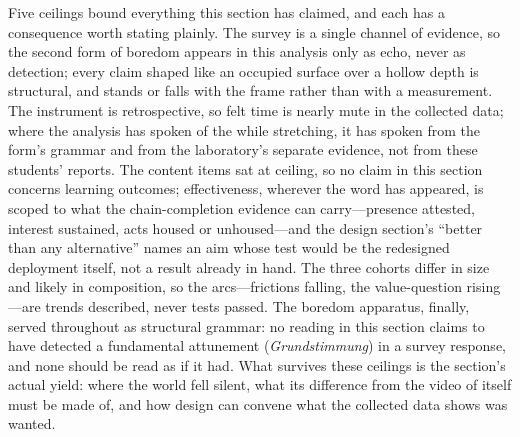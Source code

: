 
Five ceilings bound everything this section has claimed, and each has
a consequence worth stating plainly. The survey is a single channel of
evidence, so the second form of boredom appears in this analysis only
as echo, never as detection; every claim shaped like an occupied
surface over a hollow depth is structural, and stands or falls with
the frame rather than with a measurement. The instrument is
retrospective, so felt time is nearly mute in the collected data;
where the analysis has spoken of the while stretching, it has spoken
from the form's grammar and from the laboratory's separate evidence,
not from these students' reports. The content items sat at ceiling, so
no claim in this section concerns learning outcomes; effectiveness,
wherever the word has appeared, is scoped to what the chain-completion
evidence can carry---presence attested, interest sustained, acts
housed or unhoused---and the design section's ``better than any
alternative'' names an aim whose test would be the redesigned
deployment itself, not a result already in hand. The three cohorts
differ in size and likely in composition, so the arcs---frictions
falling, the value-question rising---are trends described, never tests
passed. The boredom apparatus, finally, served throughout as
structural grammar: no reading in this section claims to have detected
a fundamental attunement (\textit{Grundstimmung}) in a survey
response, and none should be read as if it had. What survives these
ceilings is the section's actual yield: where the world fell silent,
what its difference from the video of itself must be made of, and how
design can convene what the collected data shows was wanted.
